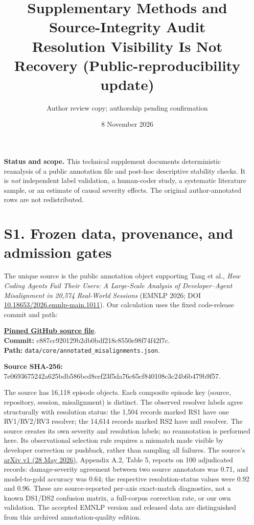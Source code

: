 \documentclass[10pt,a4paper]{article}
\title{Supplementary Methods and Source-Integrity Audit\\\large Resolution Visibility Is Not Recovery (Public-reproducibility update)}
\author{Author review copy; authorship pending confirmation}
\date{8 November 2026}
\begin{document}
\maketitle
\noindent\textbf{Status and scope.} This technical supplement documents deterministic reanalysis of a public annotation file and post-hoc descriptive stability checks. It is \emph{not} independent label validation, a human-coder study, a systematic literature sample, or an estimate of causal severity effects. The original author-annotated rows are not redistributed.

\section*{S1. Frozen data, provenance, and admission gates}
The unique source is the public annotation object supporting Tang et al., \emph{How Coding Agents Fail Their Users: A Large-Scale Analysis of Developer--Agent Misalignment in 20,574 Real-World Sessions} (EMNLP 2026; DOI \href{https://doi.org/10.18653/2026.emnlp-main.1011}{10.18653/2026.emnlp-main.1011}). Our calculation uses the fixed code-release commit and path:
\par
\noindent\href{https://github.com/ND-SaNDwichLAB/coding-agent-misalignment/blob/c887cc920129b2db0bdf218c8550e98f74f42f7c/data/core/annotated_misalignments.json}{\textbf{Pinned GitHub source file}}.\\
\textbf{Commit:} {\small\ttfamily c887cc920129b2db0bdf218c8550e98f74f42f7c}.\\
\textbf{Path:} \texttt{data/core/annotated\_misalignments.json}.
\par
\noindent\textbf{Source SHA-256:}\\ {\small\ttfamily 7e0693675242a625bdb586bcd8cef23f5da76c65cf840108c3c24b6b479b9f57}.\par The source has 16,118 episode objects. Each composite episode key (source, repository, session, misalignment) is distinct. The observed resolver labels agree structurally with resolution status: the 1,504 records marked RS1 have one RV1/RV2/RV3 resolver; the 14,614 records marked RS2 have null resolver. The source creates its own severity and resolution labels; no reannotation is performed here. Its observational selection rule requires a mismatch made visible by developer correction or pushback, rather than sampling all failures. The source's \href{https://arxiv.org/html/2605.29442v1}{arXiv v1 (28 May 2026)}, Appendix A.2, Table 5, reports on 100 adjudicated records: damage-severity agreement between two source annotators was 0.71, and model-to-gold accuracy was 0.64; the respective resolution-status values were 0.92 and 0.96. These are source-reported per-axis exact-match diagnostics, not a known DS1/DS2 confusion matrix, a full-corpus correction rate, or our own validation. The accepted EMNLP version and released data are distinguished from this archived annotation-quality edition.
\end{document}

